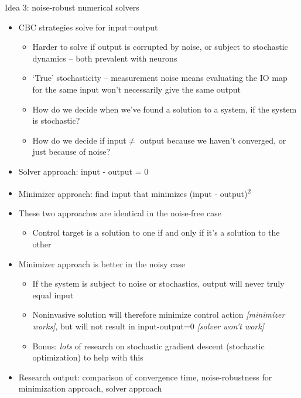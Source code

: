 \documentclass[presentation]{beamer}
\begin{document}
\begin{frame}[<+->][label={sec:org0a3e166},plain]{Idea 3: noise-robust numerical solvers}
\begin{itemize}
\item CBC strategies solve for input=output
\begin{itemize}
\item Harder to solve if output is corrupted by noise, or subject to stochastic dynamics -- both prevalent with neurons
\item `True' stochasticity -- measurement noise means evaluating the IO map for the same input won't necessarily give the same output
\item How do we decide when we've found a solution to a system, if the system is stochastic?
\item How do we decide if input\(\neq\) output because we haven't converged, or just because of noise?
\end{itemize}
\end{itemize}
\vfill
\begin{itemize}
\item Solver approach: input - output = 0
\item Minimizer approach: find input that minimizes (input - output)\textsuperscript{2}
\item These two approaches are identical in the noise-free case
\begin{itemize}
\item Control target is a solution to one if and only if it's a solution to the other
\end{itemize}
\item Minimizer approach is better in the noisy case
\begin{itemize}
\item If the system is subject to noise or stochastics, output will never truly equal input
\item Noninvasive solution will therefore minimize control action \emph{[minimizer works]}, but will not result in input-output=0 \emph{[solver won't work]}
\item Bonus: \emph{lots} of research on stochastic gradient descent (stochastic optimization) to help with this
\end{itemize}
\item Research output: comparison of convergence time, noise-robustness for minimization approach, solver approach
\end{itemize}
\end{frame}
\end{document}
